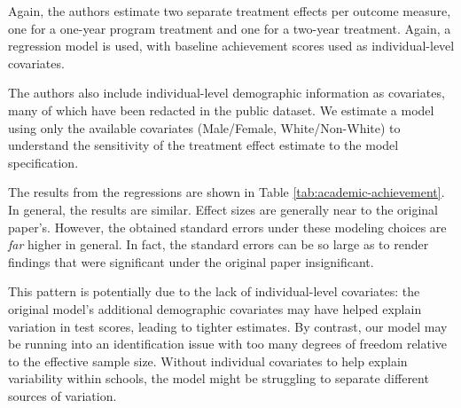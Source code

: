 \documentclass[11pt]{article}
\begin{document}
Again, the authors estimate two separate treatment effects per outcome measure,
one for a one-year program treatment and one for a two-year treatment. Again, a
regression model is used, with baseline achievement scores used as
individual-level covariates.

The authors also include individual-level
demographic information as covariates, many of which have been redacted in the
public dataset. We estimate a model using only the available covariates
(Male/Female, White/Non-White) to understand the sensitivity of the treatment
effect estimate to the model specification.

The results from the regressions are shown in Table
\ref{tab:academic-achievement}. In general, the results are similar. Effect sizes
are generally near to the original paper's. However, the obtained standard errors
under these modeling choices are \emph{far} higher in general. In fact, the standard
errors can be so large as to render findings that were significant under the original
paper insignificant.

This pattern is potentially due to the lack of individual-level
covariates: the original model's additional demographic covariates may have helped explain
variation in test scores, leading to tighter estimates. By contrast,
our model may be running into an identification issue with too many degrees of freedom relative to the effective sample size.
Without individual covariates to help explain variability within schools, the
model might be struggling to separate different sources of variation.
\end{document}
